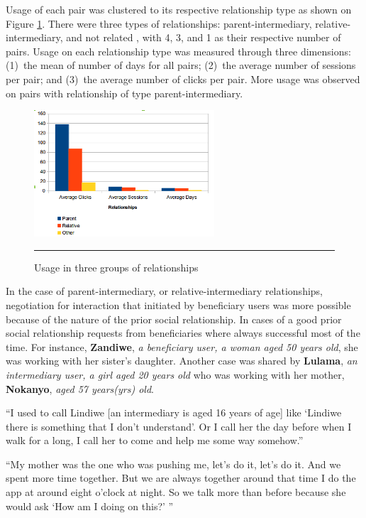 Usage of each pair  was clustered to its respective relationship type as shown on Figure \ref{figure:relation}. There were three types of relationships: parent-intermediary, relative-intermediary, and not related , with 4, 3, and 1 as their respective number of pairs. Usage on each relationship type was measured through three dimensions: (1)~the mean of number of days for all pairs; (2)~the average number of sessions per pair; and (3)~the average number of clicks per pair. More usage was observed on pairs with relationship of type parent-intermediary. 
\begin{figure}[htbp]
  \centering
    \includegraphics[width=0.6\textwidth]{Figures/relationships.png}
    \rule{35em}{0.5pt}
  \caption{Usage in three groups of relationships\citep{katule2016leveraging}}
  \label{figure:relation}
\end{figure}
In the case of parent-intermediary, or relative-intermediary relationships, negotiation for interaction that initiated by beneficiary users was more possible because of the nature of the prior social relationship. In cases of a good prior social relationship requests from beneficiaries where always successful most of the time. For instance, \textbf{Zandiwe}, \emph{a beneficiary user, a woman aged 50 years old}, she was working with her sister's daughter. Another case was shared by  \textbf{Lulama}, \emph{an intermediary user, a girl aged 20 years old} who was working with her mother, \textbf{Nokanyo}, \emph{aged 57 years(yrs) old}. 

 {``I used to call Lindiwe [an intermediary is aged 16 years of age] like `Lindiwe there is something that I don't understand'. Or I call her the day before when I walk for a long, I call her to come and help me some way somehow.''}

 {``My mother was the one who was pushing me, let’s do it, let’s do it. And we spent more time together. But we are always together around that time I do the app at around eight o'clock at night. So we talk more than before because she would ask `How am I doing on this?' ''}

